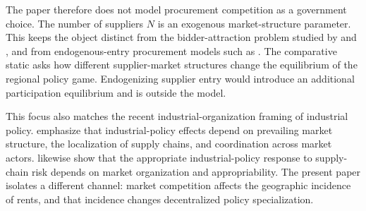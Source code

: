 The paper therefore does not model procurement competition as a government choice. The number of suppliers $N$ is an exogenous market-structure parameter. This keeps the object distinct from the bidder-attraction problem studied by \citet{Szech2011} and \citet{XuLi2019}, and from endogenous-entry procurement models such as \citet{LiZheng2009}. The comparative static asks how different supplier-market structures change the equilibrium of the regional policy game. Endogenizing supplier entry would introduce an additional participation equilibrium and is outside the model.

This focus also matches the recent industrial-organization framing of industrial policy. \citet{VanBiesebroeckZhang2026} emphasize that industrial-policy effects depend on prevailing market structure, the localization of supply chains, and coordination across market actors. \citet{MottaPolo2026} likewise show that the appropriate industrial-policy response to supply-chain risk depends on market organization and appropriability. The present paper isolates a different channel: market competition affects the geographic incidence of rents, and that incidence changes decentralized policy specialization.
